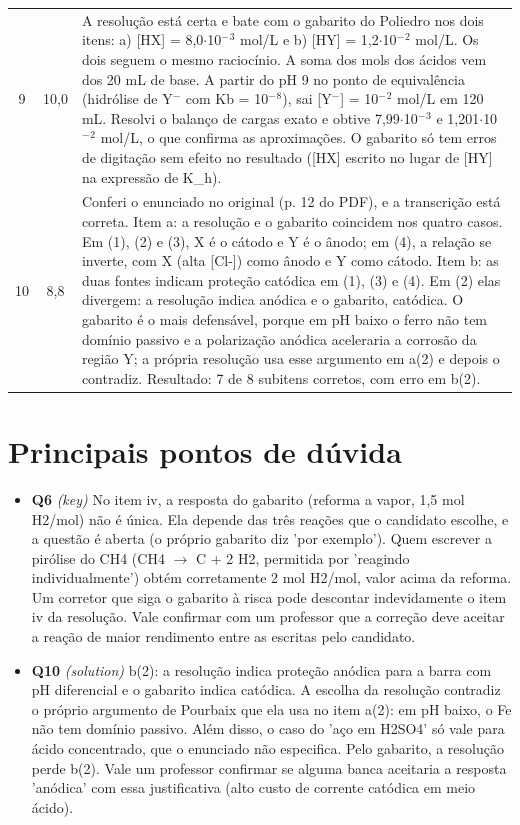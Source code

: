 \documentclass{article}%
\begin{document}
\begin{longtable}{@{}c c p{}@{}}
9 & 10,0 & A resolução está certa e bate com o gabarito do Poliedro nos dois itens: a) {[}HX{]} = 8,0$\cdot$10$^{-}$$^3$ mol/L e b) {[}HY{]} = 1,2$\cdot$10$^{-}$$^2$ mol/L. Os dois seguem o mesmo raciocínio. A soma dos mols dos ácidos vem dos 20 mL de base. A partir do pH 9 no ponto de equivalência (hidrólise de Y$^{-}$ com Kb = 10$^{-}$$^{8}$), sai {[}Y$^{-}${]} = 10$^{-}$$^2$ mol/L em 120 mL. Resolvi o balanço de cargas exato e obtive 7,99$\cdot$10$^{-}$$^3$ e 1,201$\cdot$10$^{-}$$^2$ mol/L, o que confirma as aproximações. O gabarito só tem erros de digitação sem efeito no resultado ({[}HX{]} escrito no lugar de {[}HY{]} na expressão de K\_h). \\
10 & 8,8 & Conferi o enunciado no original (p. 12 do PDF), e a transcrição está correta. Item a: a resolução e o gabarito coincidem nos quatro casos. Em (1), (2) e (3), X é o cátodo e Y é o ânodo; em (4), a relação se inverte, com X (alta {[}Cl-{]}) como ânodo e Y como cátodo. Item b: as duas fontes indicam proteção catódica em (1), (3) e (4). Em (2) elas divergem: a resolução indica anódica e o gabarito, catódica. O gabarito é o mais defensável, porque em pH baixo o ferro não tem domínio passivo e a polarização anódica aceleraria a corrosão da região Y; a própria resolução usa esse argumento em a(2) e depois o contradiz. Resultado: 7 de 8 subitens corretos, com erro em b(2). \\
\bottomrule\end{longtable}%
\section*{Principais pontos de dúvida}%
\begin{itemize}%
\item%
\textbf{Q6} \textit{(key)} No item iv, a resposta do gabarito (reforma a vapor, 1,5 mol H2/mol) não é única. Ela depende das três reações que o candidato escolhe, e a questão é aberta (o próprio gabarito diz 'por exemplo'). Quem escrever a pirólise do CH4 (CH4 $\to$ C + 2 H2, permitida por 'reagindo individualmente') obtém corretamente 2 mol H2/mol, valor acima da reforma. Um corretor que siga o gabarito à risca pode descontar indevidamente o item iv da resolução. Vale confirmar com um professor que a correção deve aceitar a reação de maior rendimento entre as escritas pelo candidato.%
\item%
\textbf{Q10} \textit{(solution)} b(2): a resolução indica proteção anódica para a barra com pH diferencial e o gabarito indica catódica. A escolha da resolução contradiz o próprio argumento de Pourbaix que ela usa no item a(2): em pH baixo, o Fe não tem domínio passivo. Além disso, o caso do 'aço em H2SO4' só vale para ácido concentrado, que o enunciado não especifica. Pelo gabarito, a resolução perde b(2). Vale um professor confirmar se alguma banca aceitaria a resposta 'anódica' com essa justificativa (alto custo de corrente catódica em meio ácido).%
\end{itemize}%
\end{document}
